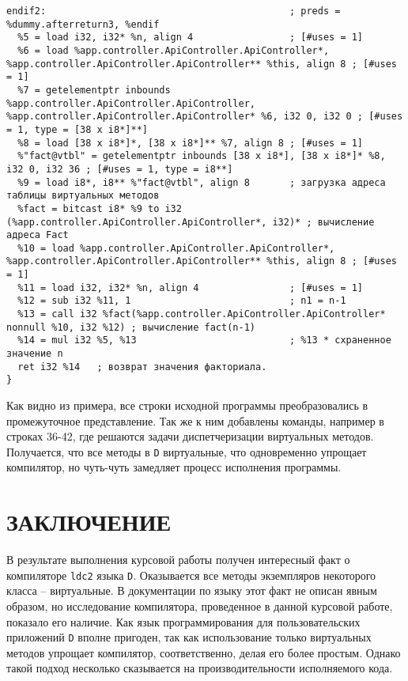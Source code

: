 \documentclass[732]{studrep}
\begin{document}
\begin{verbatim}
endif2:                                           ; preds = %dummy.afterreturn3, %endif
  %5 = load i32, i32* %n, align 4                 ; [#uses = 1]
  %6 = load %app.controller.ApiController.ApiController*, %app.controller.ApiController.ApiController** %this, align 8 ; [#uses = 1]
  %7 = getelementptr inbounds %app.controller.ApiController.ApiController, %app.controller.ApiController.ApiController* %6, i32 0, i32 0 ; [#uses = 1, type = [38 x i8*]**]
  %8 = load [38 x i8*]*, [38 x i8*]** %7, align 8 ; [#uses = 1]
  %"fact@vtbl" = getelementptr inbounds [38 x i8*], [38 x i8*]* %8, i32 0, i32 36 ; [#uses = 1, type = i8**]
  %9 = load i8*, i8** %"fact@vtbl", align 8       ; загрузка адреса таблицы виртуальных методов
  %fact = bitcast i8* %9 to i32 (%app.controller.ApiController.ApiController*, i32)* ; вычисление адреса Fact
  %10 = load %app.controller.ApiController.ApiController*, %app.controller.ApiController.ApiController** %this, align 8 ; [#uses = 1]
  %11 = load i32, i32* %n, align 4                ; [#uses = 1]
  %12 = sub i32 %11, 1                            ; n1 = n-1
  %13 = call i32 %fact(%app.controller.ApiController.ApiController* nonnull %10, i32 %12) ; вычисление fact(n-1)
  %14 = mul i32 %5, %13                           ; %13 * схраненное значение n
  ret i32 %14   ; возврат значения факториала.
}
\end{verbatim}

Как видно из примера, все строки исходной программы преобразовались в промежуточное представление.  Так же к ним добавлены команды, например в строках 36-42, где решаются задачи диспетчеризации виртуальных методов.  Получается, что все методы в \verb|D| виртуальные, что одновременно упрощает компилятор, но чуть-чуть замедляет процесс исполнения программы.

\chapter*{ЗАКЛЮЧЕНИЕ}

В результате выполнения курсовой работы получен интересный факт о компиляторе \verb|ldc2| языка \verb|D|.  Оказывается все методы экземпляров некоторого класса -- виртуальные.  В документации по языку этот факт не описан явным образом, но исследование компилятора, проведенное в данной курсовой работе, показало его наличие.  Как язык программирования для пользовательских приложений \verb|D| вполне пригоден, так как использование только виртуальных методов упрощает компилятор, соответственно, делая его более простым. Однако такой подход несколько сказывается на производительности исполняемого кода.
\end{document}
